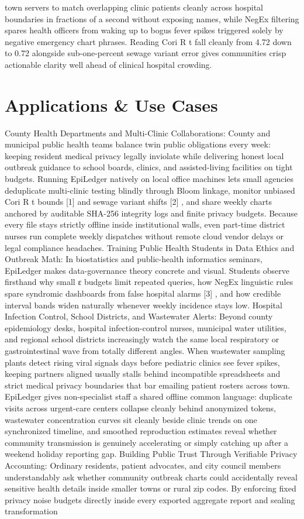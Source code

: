 \documentclass[10pt,letterpaper]{article}
\begin{document}
town servers to match overlapping clinic patients cleanly across hospital boundaries in fractions of a second without exposing names, while NegEx filtering spares health officers from waking up to bogus fever spikes triggered solely by negative emergency chart phrases. Reading Cori R t fall cleanly from 4.72 down to 0.72 alongside sub-one-percent sewage variant error gives communities crisp actionable clarity well ahead of clinical hospital crowding.

\section{Applications \& Use Cases}
County Health Departments and Multi-Clinic Collaborations: County and municipal public health teams balance twin public obligations every week: keeping resident medical privacy legally inviolate while delivering honest local outbreak guidance to school boards, clinics, and assisted-living facilities on tight budgets. Running EpiLedger natively on local office machines lets small agencies deduplicate multi-clinic testing blindly through Bloom linkage, monitor unbiased Cori R t bounds [1] and sewage variant shifts [2] , and share weekly charts anchored by auditable SHA-256 integrity logs and finite privacy budgets. Because every file stays strictly offline inside institutional walls, even part-time district nurses run complete weekly dispatches without remote cloud vendor delays or legal compliance headaches. Training Public Health Students in Data Ethics and Outbreak Math: In biostatistics and public-health informatics seminars, EpiLedger makes data-governance theory concrete and visual. Students observe firsthand why small ε budgets limit repeated queries, how NegEx linguistic rules spare syndromic dashboards from false hospital alarms [3] , and how credible interval bands widen naturally whenever weekly incidence stays low. Hospital Infection Control, School Districts, and Wastewater Alerts: Beyond county epidemiology desks, hospital infection-control nurses, municipal water utilities, and regional school districts increasingly watch the same local respiratory or gastrointestinal wave from totally different angles. When wastewater sampling plants detect rising viral signals days before pediatric clinics see fever spikes, keeping partners aligned usually stalls behind incompatible spreadsheets and strict medical privacy boundaries that bar emailing patient rosters across town. EpiLedger gives non-specialist staff a shared offline common language: duplicate visits across urgent-care centers collapse cleanly behind anonymized tokens, wastewater concentration curves sit cleanly beside clinic trends on one synchronized timeline, and smoothed reproduction estimates reveal whether community transmission is genuinely accelerating or simply catching up after a weekend holiday reporting gap. Building Public Trust Through Verifiable Privacy Accounting: Ordinary residents, patient advocates, and city council members understandably ask whether community outbreak charts could accidentally reveal sensitive health details inside smaller towns or rural zip codes. By enforcing fixed privacy noise budgets directly inside every exported aggregate report and sealing transformation 
\end{document}

